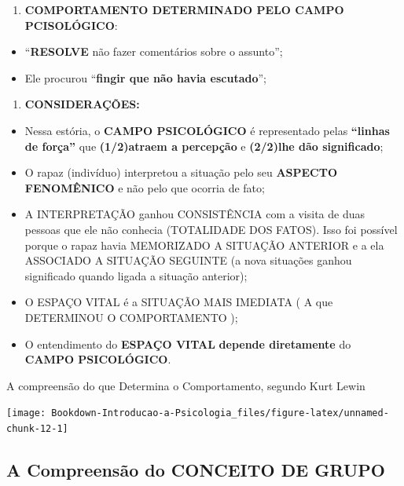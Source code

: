\documentclass[
]{book}
\providecommand{\tightlist}{%
  \setlength{\itemsep}{0pt}\setlength{\parskip}{0pt}}
\begin{document}
\begin{enumerate}
\def\labelenumi{\arabic{enumi}.}
\setcounter{enumi}{1}
\tightlist
\item
  \textbf{COMPORTAMENTO DETERMINADO PELO CAMPO PCISOLÓGICO}:
\end{enumerate}

\begin{itemize}
\tightlist
\item
  ``\textbf{RESOLVE} não fazer comentários sobre o assunto'';
\item
  Ele procurou ``\textbf{fingir que não havia escutado}'';
\end{itemize}

\begin{enumerate}
\def\labelenumi{\arabic{enumi}.}
\setcounter{enumi}{2}
\tightlist
\item
  \textbf{CONSIDERAÇÕES:}
\end{enumerate}

\begin{itemize}
\tightlist
\item
  Nessa estória, o \textbf{CAMPO PSICOLÓGICO} é representado pelas \textbf{``linhas de força''} que \textbf{(1/2)atraem a percepção} e \textbf{(2/2)lhe dão significado};
\item
  O rapaz (indivíduo) interpretou a situação pelo seu \textbf{ASPECTO FENOMÊNICO} e não pelo que ocorria de fato;
\item
  A INTERPRETAÇÃO ganhou CONSISTÊNCIA com a visita de duas pessoas que ele não conhecia (TOTALIDADE DOS FATOS). Isso foi possível porque o rapaz havia MEMORIZADO A SITUAÇÃO ANTERIOR e a ela ASSOCIADO A SITUAÇÃO SEGUINTE (a nova situações ganhou significado quando ligada a situação anterior);
\item
  O ESPAÇO VITAL é a SITUAÇÃO MAIS IMEDIATA ( A que DETERMINOU O COMPORTAMENTO );
\item
  O entendimento do \textbf{ESPAÇO VITAL} \textbf{depende diretamente} do \textbf{CAMPO PSICOLÓGICO}.
\end{itemize}

A compreensão do que Determina o Comportamento, segundo Kurt Lewin

\texttt{[image: Bookdown-Introducao-a-Psicologia\_files/figure-latex/unnamed-chunk-12-1]}

\hypertarget{a-compreensuxe3o-do-conceito-de-grupo}{%
\subsection{A Compreensão do CONCEITO DE GRUPO}\label{a-compreensuxe3o-do-conceito-de-grupo}}
\end{document}
